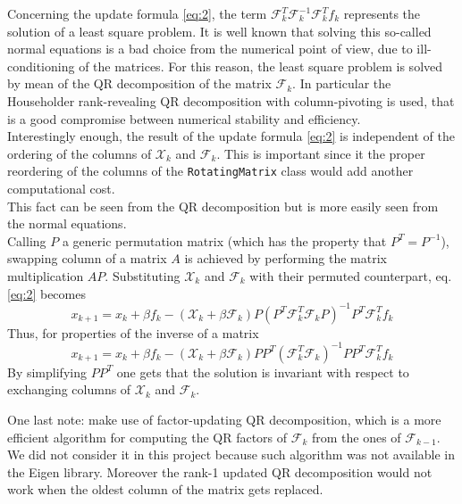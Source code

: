 \documentclass[12pt]{article}
\begin{document}
		Concerning the update formula \ref{eq:2}, the term $\mathscr{F}_k^T \mathscr{F}_k^{-1}\mathscr{F}_k^T f_k$
		represents the solution of a least square problem. It is well known that solving this so-called normal
		equations is a bad choice from the numerical point of view, due to ill-conditioning of the matrices.
		For this reason, the least square problem is solved by mean of the QR decomposition of the matrix $\mathscr{F}_k$. In particular the
		Householder rank-revealing QR decomposition with column-pivoting is used, that is a good compromise
		between numerical stability and efficiency.\\
		Interestingly enough, the result of the update formula \ref{eq:2} is independent of the ordering of the columns
		of $\mathscr{X}_k$ and $\mathscr{F}_k$. This is important since it 
		the proper reordering of the columns of the \verb|RotatingMatrix| class would add another computational cost.\\		
		This fact can be seen from the QR decomposition but is more easily seen from the normal equations.\\
		Calling $P$ a generic permutation matrix (which has the property
		that $P^T=P^{-1}$), swapping column of a matrix $A$ is achieved by performing the matrix multiplication $AP$.
		Substituting $\mathscr{X}_k$ and $\mathscr{F}_k$ with their permuted counterpart, eq. \ref{eq:2} becomes
		\begin{equation}
			x_{k+1}=x_{k} + \beta f_k -(\mathscr{X}_k + \beta \mathscr{F}_k)P(P^T \mathscr{F}_k^T \mathscr{F}_k P)^{-1}P^T \mathscr{F}_k^T f_k
		\end{equation}
		Thus, for properties of the inverse of a matrix
		\begin{equation}
			x_{k+1}=x_{k} + \beta f_k -(\mathscr{X}_k + \beta \mathscr{F}_k)P P^T (\mathscr{F}_k^T \mathscr{F}_k)^{-1} P P^T \mathscr{F}_k^T f_k
		\end{equation}
		By simplifying $P P^T$ one gets that the solution is invariant with respect to exchanging columns of $\mathscr{X}_k$ and $\mathscr{F}_k$.
		
		One last note: \citeauthor{Walker} \cite{Walker} make use of factor-updating QR decomposition, which is a more efficient algorithm
		for computing the QR factors of $\mathscr{F}_k$ from the ones of $\mathscr{F}_{k-1}$. We did not consider it in this project
		because such algorithm was not available in the Eigen library. Moreover the rank-1 updated QR decomposition would not work
		when the oldest column of the matrix gets replaced.
		
\end{document}

